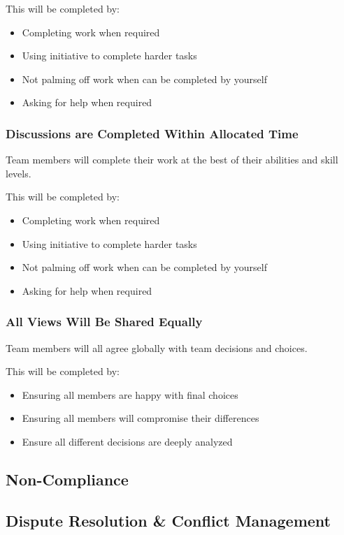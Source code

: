 \documentclass[12pt, a4paper, onecolumn]{article}
\begin{document}
This will be completed by:
\begin{itemize}
  \setlength\itemsep{1px}
  \item Completing work when required
  \item Using initiative to complete harder tasks
  \item Not palming off work when can be completed by yourself
  \item Asking for help when required
\end{itemize}

\subsubsection{Discussions are Completed Within Allocated Time}
Team members will complete their work at the best of their abilities
and skill levels.

This will be completed by:
\begin{itemize}
  \setlength\itemsep{1px}
  \item Completing work when required
  \item Using initiative to complete harder tasks
  \item Not palming off work when can be completed by yourself
  \item Asking for help when required
\end{itemize}

\subsubsection{All Views Will Be Shared Equally}
Team members will all agree globally with team decisions and choices.

This will be completed by:
\begin{itemize}
  \setlength\itemsep{1px}
  \item Ensuring all members are happy with final choices
  \item Ensuring all members will compromise their differences
  \item Ensure all different decisions are deeply analyzed
\end{itemize}

\subsection{Non-Compliance}

\subsection{Dispute Resolution \& Conflict Management}
\end{document}
